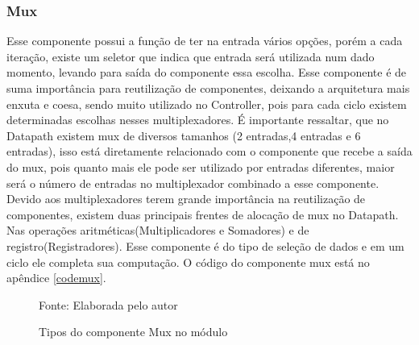 \subsubsection{Mux}
Esse componente possui a função de ter na entrada vários opções, porém a cada iteração, existe um seletor que indica que entrada será utilizada num dado momento, levando para saída do componente essa escolha. Esse componente é de suma importância para reutilização de componentes, deixando a arquitetura mais enxuta e coesa, sendo muito utilizado no Controller, pois para cada ciclo existem determinadas escolhas nesses multiplexadores. É importante ressaltar, que no Datapath existem mux de diversos tamanhos (2 entradas,4 entradas e 6 entradas), isso está diretamente relacionado com o componente que recebe a saída do mux, pois quanto mais ele pode ser utilizado por entradas diferentes, maior será o número de entradas no multiplexador combinado a esse componente. Devido aos multiplexadores terem grande importância na reutilização de componentes, existem duas principais frentes de alocação de mux no Datapath. Nas operações aritméticas(Multiplicadores e Somadores) e de registro(Registradores). Esse componente é do tipo de seleção de dados e em um ciclo ele completa sua computação. O código do componente mux está no apêndice \ref{codemux}.	

\begin{figure}[H]
	\caption{Tipos do componente Mux no módulo 	}
	\centering
	\quad %
	\quad %
	
	{Fonte: Elaborada pelo autor}
	\label{fig01}
\end{figure}

